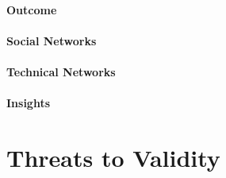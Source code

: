 \paragraph{Outcome}

\paragraph{Social Networks}

\paragraph{Technical Networks}

\paragraph{Insights}


\section{Threats to Validity}
